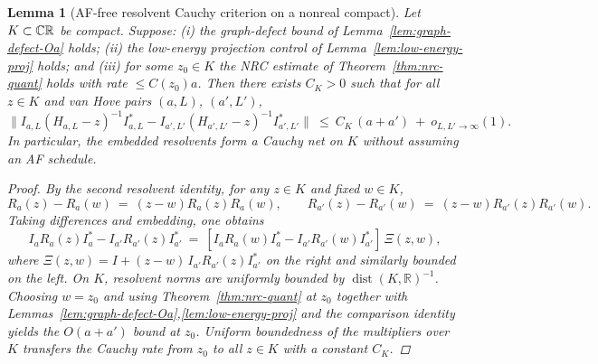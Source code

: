 \documentclass[11pt]{amsart}
\theoremstyle{plain}
\newtheorem{lemma}[theorem]{Lemma}
\theoremstyle{definition}
\theoremstyle{remark}
\begin{document}
\begin{lemma}[AF-free resolvent Cauchy criterion on a nonreal compact]\label{lem:af-free-cauchy}
Let $K\subset \mathbb C\\\mathbb R$ be compact. Suppose: (i) the graph-defect bound of Lemma~\ref{lem:graph-defect-Oa} holds; (ii) the low-energy projection control of Lemma~\ref{lem:low-energy-proj} holds; and (iii) for some $z_0\in K$ the NRC estimate of Theorem~\ref{thm:nrc-quant} holds with rate $\le C(z_0) a$. Then there exists $C_K>0$ such that for all $z\in K$ and van Hove pairs $(a,L)$, $(a',L')$,
\[
  \big\| I_{a,L}(H_{a,L}-z)^{-1} I_{a,L}^* - I_{a',L'}(H_{a',L'}-z)^{-1} I_{a',L'}^* \big\|
  \ \le\ C_K\,(a+a')\ +\ o_{L,L'\to\infty}(1).
\]
In particular, the embedded resolvents form a Cauchy net on $K$ without assuming an AF schedule.
\begin{proof}
By the second resolvent identity, for any $z\in K$ and fixed $w\in K$,
\[
  R_{a}(z)-R_{a}(w)\ =\ (z-w) R_{a}(z) R_{a}(w),\qquad R_{a'}(z)-R_{a'}(w)\ =\ (z-w) R_{a'}(z) R_{a'}(w).
\]
Taking differences and embedding, one obtains
\[
  I_{a}R_{a}(z)I_{a}^* - I_{a'}R_{a'}(z)I_{a'}^*\ =\ [I_{a}R_{a}(w)I_{a}^* - I_{a'}R_{a'}(w)I_{a'}^*]\,\Xi(z,w),
\]
where $\Xi(z,w)=I+(z-w)\,I_{a'}R_{a'}(z)I_{a'}^*$ on the right and similarly bounded on the left. On $K$, resolvent norms are uniformly bounded by $\operatorname{dist}(K,\mathbb R)^{-1}$. Choosing $w=z_0$ and using Theorem~\ref{thm:nrc-quant} at $z_0$ together with Lemmas~\ref{lem:graph-defect-Oa},\ref{lem:low-energy-proj} and the comparison identity yields the $O(a+a')$ bound at $z_0$. Uniform boundedness of the multipliers over $K$ transfers the Cauchy rate from $z_0$ to all $z\in K$ with a constant $C_K$.
\end{proof}
\end{lemma}
\end{document}
